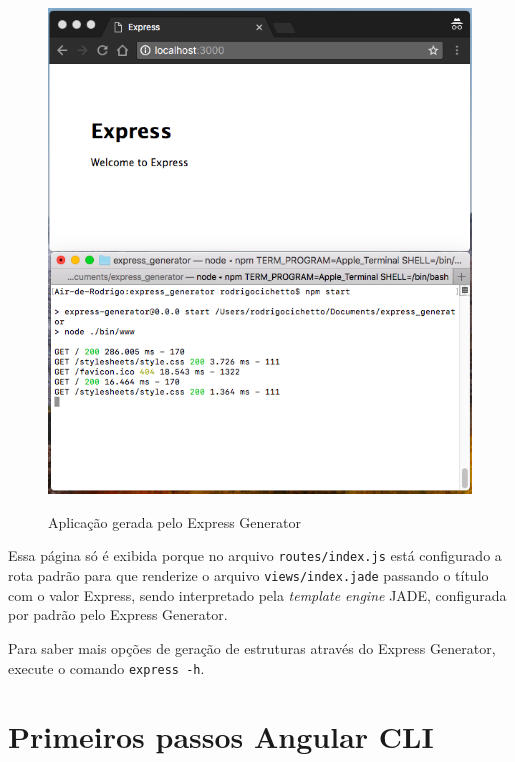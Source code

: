 \documentclass[
	12pt,				%
	openright,			%
	twoside,			%
	a4paper,			%
	english,			%
	brazil				%
	]{abntex2}
\begin{document}
\begin{anexosenv}
\begin{figure}[h]
	\centering

	\caption{Aplicação gerada pelo Express Generator} \label{fig:ExpressGeneratorApp}
    \includegraphics[scale=0.5]{express-generator-app} \\

\end{figure}

Essa página só é exibida porque no arquivo \verb|routes/index.js| está configurado a rota padrão para que renderize o arquivo \verb|views/index.jade| passando o título com o valor Express, sendo interpretado pela \textit{template engine} JADE, configurada por padrão pelo Express Generator.

Para saber mais opções de geração de estruturas através do Express Generator, execute o comando \verb|express -h|.

\chapter{Primeiros passos Angular CLI} 


\end{anexosenv}
\end{document}
